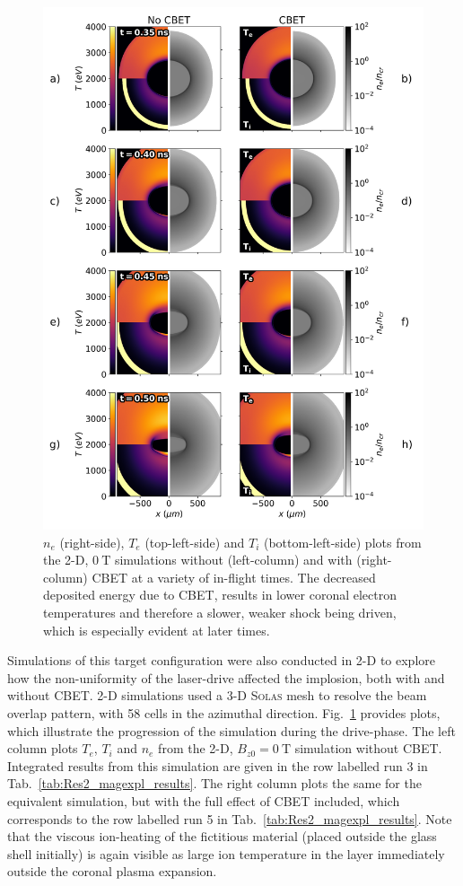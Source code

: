 \begin{figure}[t!]
    \includegraphics[width=0.95\linewidth]{Results2/Images/unmag_CBET_onoff.png}
    \centering
    \caption{$n_e$ (right-side), $T_e$ (top-left-side) and $T_i$ (bottom-left-side) plots from the 2-D, $0\ \text{T}$ simulations without (left-column) and with (right-column) \ac{CBET} at a variety of in-flight times.
    The decreased deposited energy due to \ac{CBET}, results in lower coronal electron temperatures and therefore a slower, weaker shock being driven, which is especially evident at later times.}%
    \label{fig:Res2_unmag_CBET_onoff}
\end{figure}

Simulations of this target configuration were also conducted in 2-D to explore how the non-uniformity of the laser-drive affected the implosion, both with and without \ac{CBET}.
2-D simulations used a 3-D \textsc{Solas} mesh to resolve the beam overlap pattern, with 58 cells in the azimuthal direction.
Fig.~\ref{fig:Res2_unmag_CBET_onoff} provides plots, which illustrate the progression of the simulation during the drive-phase.
The left column plots $T_e$, $T_i$ and $n_e$ from the 2-D, $B_{z0}=0\ \text{T}$ simulation without \ac{CBET}.
Integrated results from this simulation are given in the row labelled run 3 in Tab.~\ref{tab:Res2_magexpl_results}.
The right column plots the same for the equivalent simulation, but with the full effect of \ac{CBET} included, which corresponds to the row labelled run 5 in Tab.~\ref{tab:Res2_magexpl_results}.
Note that the viscous ion-heating of the fictitious material (placed outside the glass shell initially) is again visible as large ion temperature in the layer immediately outside the coronal plasma expansion.

